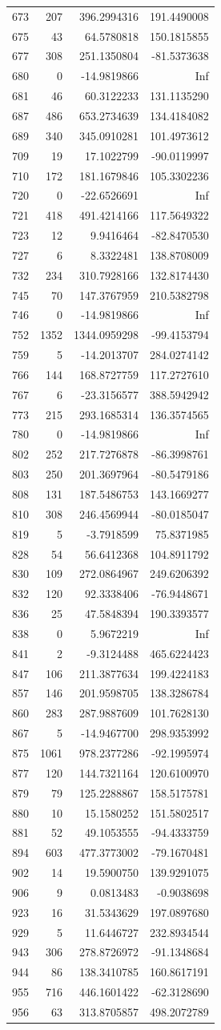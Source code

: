 \documentclass[
]{article}
\begin{document}
\begin{longtable}[]{@{}lrrr@{}}
673 & 207 & 396.2994316 & 191.4490008\tabularnewline
675 & 43 & 64.5780818 & 150.1815855\tabularnewline
677 & 308 & 251.1350804 & -81.5373638\tabularnewline
680 & 0 & -14.9819866 & Inf\tabularnewline
681 & 46 & 60.3122233 & 131.1135290\tabularnewline
687 & 486 & 653.2734639 & 134.4184082\tabularnewline
689 & 340 & 345.0910281 & 101.4973612\tabularnewline
709 & 19 & 17.1022799 & -90.0119997\tabularnewline
710 & 172 & 181.1679846 & 105.3302236\tabularnewline
720 & 0 & -22.6526691 & Inf\tabularnewline
721 & 418 & 491.4214166 & 117.5649322\tabularnewline
723 & 12 & 9.9416464 & -82.8470530\tabularnewline
727 & 6 & 8.3322481 & 138.8708009\tabularnewline
732 & 234 & 310.7928166 & 132.8174430\tabularnewline
745 & 70 & 147.3767959 & 210.5382798\tabularnewline
746 & 0 & -14.9819866 & Inf\tabularnewline
752 & 1352 & 1344.0959298 & -99.4153794\tabularnewline
759 & 5 & -14.2013707 & 284.0274142\tabularnewline
766 & 144 & 168.8727759 & 117.2727610\tabularnewline
767 & 6 & -23.3156577 & 388.5942942\tabularnewline
773 & 215 & 293.1685314 & 136.3574565\tabularnewline
780 & 0 & -14.9819866 & Inf\tabularnewline
802 & 252 & 217.7276878 & -86.3998761\tabularnewline
803 & 250 & 201.3697964 & -80.5479186\tabularnewline
808 & 131 & 187.5486753 & 143.1669277\tabularnewline
810 & 308 & 246.4569944 & -80.0185047\tabularnewline
819 & 5 & -3.7918599 & 75.8371985\tabularnewline
828 & 54 & 56.6412368 & 104.8911792\tabularnewline
830 & 109 & 272.0864967 & 249.6206392\tabularnewline
832 & 120 & 92.3338406 & -76.9448671\tabularnewline
836 & 25 & 47.5848394 & 190.3393577\tabularnewline
838 & 0 & 5.9672219 & Inf\tabularnewline
841 & 2 & -9.3124488 & 465.6224423\tabularnewline
847 & 106 & 211.3877634 & 199.4224183\tabularnewline
857 & 146 & 201.9598705 & 138.3286784\tabularnewline
860 & 283 & 287.9887609 & 101.7628130\tabularnewline
867 & 5 & -14.9467700 & 298.9353992\tabularnewline
875 & 1061 & 978.2377286 & -92.1995974\tabularnewline
877 & 120 & 144.7321164 & 120.6100970\tabularnewline
879 & 79 & 125.2288867 & 158.5175781\tabularnewline
880 & 10 & 15.1580252 & 151.5802517\tabularnewline
881 & 52 & 49.1053555 & -94.4333759\tabularnewline
894 & 603 & 477.3773002 & -79.1670481\tabularnewline
902 & 14 & 19.5900750 & 139.9291075\tabularnewline
906 & 9 & 0.0813483 & -0.9038698\tabularnewline
923 & 16 & 31.5343629 & 197.0897680\tabularnewline
929 & 5 & 11.6446727 & 232.8934544\tabularnewline
943 & 306 & 278.8726972 & -91.1348684\tabularnewline
944 & 86 & 138.3410785 & 160.8617191\tabularnewline
955 & 716 & 446.1601422 & -62.3128690\tabularnewline
956 & 63 & 313.8705857 & 498.2072789\tabularnewline

\end{longtable}
\end{document}
